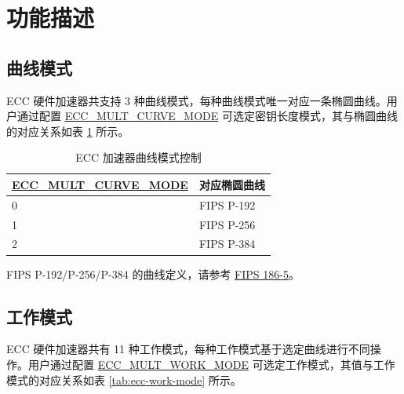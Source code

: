 \documentclass[main\_\_CN.tex]{subfiles}
\begin{document}
\section{功能描述}
\label{sec:ecc-mode-config}
\subsection{曲线模式}

\chipname{} ECC 硬件加速器共支持 3 种曲线模式，每种曲线模式唯一对应一条椭圆曲线。用户通过配置 \hyperref[fielddesc:ECCMULTCURVEMODE]{ECC\_MULT\_CURVE\_MODE} 可选定密钥长度模式，其与椭圆曲线的对应关系如表 \ref{tab:ecc-curve-mode} 所示。


\begin{table}[H]
    \centering
    \caption{ECC 加速器曲线模式控制}
    \label{tab:ecc-curve-mode}
    \begin{threeparttable}
    \begin{tabular}{|p{4.2cm}|p{3.6cm}|}
    \hline
        \rowcolor{lightgray}
        \textbf{\hyperref[fielddesc:ECCMULTCURVEMODE]{ECC\_MULT\_CURVE\_MODE}} & \textbf{对应椭圆曲线\tnote{*}} \\ \hline
        0 & FIPS P-192  \\\hline
        1 & FIPS P-256  \\\hline
        2 & FIPS P-384  \\\hline
    \end{tabular}
    \begin{tablenotes}
        \item[*] FIPS P-192/P-256/P-384 的曲线定义，请参考 \href{https://nvlpubs.nist.gov/nistpubs/FIPS/NIST.FIPS.186-5.pdf}{FIPS 186-5}。
    \end{tablenotes}
    \end{threeparttable}
\end{table}

\subsection{工作模式}
\label{sec:ecc-work-mode}

\chipname{} ECC 硬件加速器共有 11 种工作模式，每种工作模式基于选定曲线进行不同操作。用户通过配置 \hyperref[fielddesc:ECCMULTWORKMODE]{ECC\_MULT\_WORK\_MODE} 可选定工作模式，其值与工作模式的对应关系如表 \ref{tab:ecc-work-mode} 所示。
\end{document}
